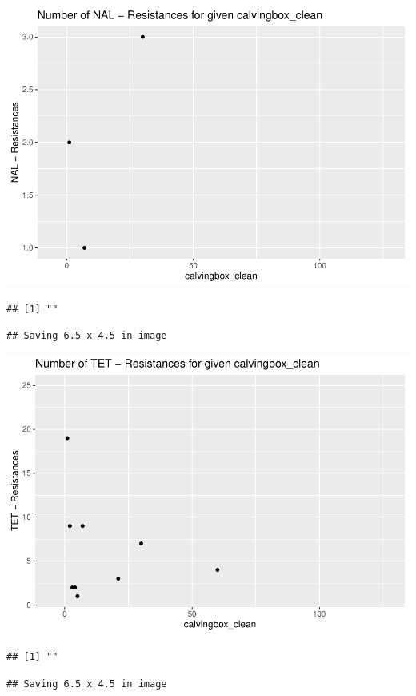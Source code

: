 \documentclass[
]{article}
\begin{document}
\includegraphics{NResistenzen_files/figure-latex/numerical_variables-27.pdf}

\begin{verbatim}
## [1] ""
\end{verbatim}

\begin{verbatim}
## Saving 6.5 x 4.5 in image
\end{verbatim}

\includegraphics{NResistenzen_files/figure-latex/numerical_variables-28.pdf}

\begin{verbatim}
## [1] ""
\end{verbatim}

\begin{verbatim}
## Saving 6.5 x 4.5 in image
\end{verbatim}
\end{document}
